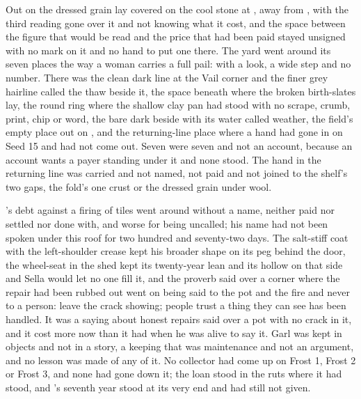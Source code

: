 \scenebreak

Out on  the dressed grain lay covered on the cool stone at , away from , with the third reading gone over it and not knowing what it cost, and the space between the figure that would be read and the price that had been paid stayed unsigned with no mark on it and no hand to put one there. The yard went around its seven places the way a woman carries a full pail: with a look, a wide step and no number. There was the clean dark line at the Vail corner and the finer grey hairline called the thaw beside it, the space beneath  where the broken birth-slates lay, the round ring where the shallow clay pan had stood with no scrape, crumb, print, chip or word, the bare dark  beside  with its water called weather, the field's empty place out on , and the returning-line place where a hand had gone in on Seed 15 and had not come out. Seven were seven and not an account, because an account wants a payer standing under it and none stood. The hand in the returning line was carried and not named, not paid and not joined to the shelf's two gaps, the fold's one crust or the dressed grain under wool.

's debt against a firing of tiles went around without a name, neither paid nor settled nor done with, and worse for being uncalled; his name had not been spoken under this roof for two hundred and seventy-two days. The salt-stiff coat with the left-shoulder crease kept his broader shape on its peg behind the door, the wheel-seat in the shed kept its twenty-year lean and its hollow on that side and Sella would let no one fill it, and the proverb said over a corner where the repair had been rubbed out went on being said to the pot and the fire and never to a person: leave the crack showing; people trust a thing they can see has been handled. It was a saying about honest repairs said over a pot with no crack in it, and it cost more now than it had when he was alive to say it. Garl was kept in objects and not in a story, a keeping that was maintenance and not an argument, and no lesson was made of any of it. No collector had come up  on Frost 1, Frost 2 or Frost 3, and none had gone down it; the loan stood in the ruts where it had stood, and 's seventh year stood at its very end and had still not given.

